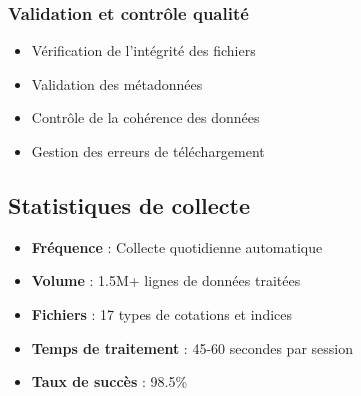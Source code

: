 \subsubsection{Validation et contrôle qualité}
\begin{itemize}
    \item Vérification de l'intégrité des fichiers
    \item Validation des métadonnées
    \item Contrôle de la cohérence des données
    \item Gestion des erreurs de téléchargement
\end{itemize}

\subsection{Statistiques de collecte}
\begin{itemize}
    \item \textbf{Fréquence} : Collecte quotidienne automatique
    \item \textbf{Volume} : 1.5M+ lignes de données traitées
    \item \textbf{Fichiers} : 17 types de cotations et indices
    \item \textbf{Temps de traitement} : 45-60 secondes par session
    \item \textbf{Taux de succès} : 98.5\%
\end{itemize}

